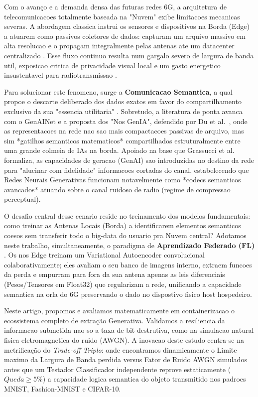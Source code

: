 \documentclass[conference]{IEEEtran}
\begin{document}
Com o avanço e a demanda densa das futuras redes 6G, a arquitetura de telecomunicacoes totalmente baseada na "Nuvem" exibe limitacoes mecanicas severas.
A abordagem classica instrui os sensores e dispositivos na Borda (Edge) a atuarem como passivos coletores de dados: capturam um arquivo massivo em alta resolucao e o propagam integralmente pelas antenas ate um datacenter centralizado \cite{yang2022semantic}. Esse fluxo continuo resulta num gargalo severo de largura de banda util, exposicao critica de privacidade visual local e um gasto energetico insustentavel para radiotransmissao \cite{kairouz2021advances}.

Para solucionar este fenomeno, surge a \textbf{Comunicacao Semantica}, a qual propoe o descarte deliberado dos dados exatos em favor do compartilhamento exclusivo da sua "essencia utilitaria" \cite{xie2021deep}. 
Sobretudo, a literatura de ponta avanca com o GenAINet e a proposta dos "Nos GenIA", defendido por Du et al.~\cite{du2023genainet}, onde as representacoes na rede nao sao mais compactacoes passivas de arquivo, mas sim *gatilhos semanticos matematicos* compartilhados estruturalmente entre uma grande colmeia de IAs na borda. 
Apoiado na base que Grassucci et al.~\cite{grassucci2023genai_meets_semcom} formaliza, as capacidades de geracao (GenAI) sao introduzidas no destino da rede para "alucinar com fidelidade" informacoes cortadas do canal, estabelecendo que Redes Neurais Generativas funcionam notavelmente como *codecs semanticos avancados* atuando sobre o canal ruidoso de radio (regime de compressao perceptual).

O desafio central desse cenario reside no treinamento dos modelos fundamentais: como treinar as Antenas Locais (Borda) a identificarem elementos semanticos coesos sem transferir todo o big-data do usuario pra Nuvem central? 
Adotamos neste trabalho, simultaneamente, o paradigma de \textbf{Aprendizado Federado (FL)} \cite{mcmahan2017}. Os nos Edge treinam um Variational Autoencoder convolucional colaborativamente; eles avaliam o seu banco de imagens interno, extraem funcoes da perda e empurram para fora da sua antena apenas as leis diferenciais (Pesos/Tensores em Float32) que regularizam a rede, unificando a capacidade semantica na orla do 6G preservando o dado no dispostivo fisico host hospedeiro.

Neste artigo, propomos e avaliamos matematicamente em containerizacao o ecossistema completo de extração Generativa. Validamos a resiliencia da informacao submetida nao so a taxa de bit destrutiva, como na simulacao natural fisica eletromagnetica do ruido (AWGN). A inovacao deste estudo centra-se na metrificação do \textit{Trade-off Triplo}: onde encontramos dinamicamente o Limite maximo da Largura de Banda perdida versus Fator de Ruido AWGN simulados antes que um Testador Classificador independente reprove estaticamente ($Queda \geq 5\%$) a capacidade logica semantica do objeto transmitido nos padroes MNIST, Fashion-MNIST e CIFAR-10.
\end{document}
